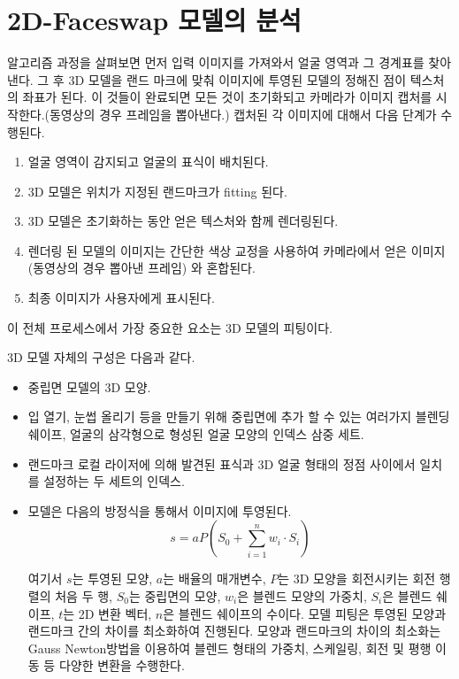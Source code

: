 \documentclass{oblivoir}
\begin{document}
\section{2D-Faceswap 모델의 분석}

알고리즘 과정을 살펴보면 먼저 입력 이미지를 가져와서 얼굴 영역과 그 경계표를 찾아낸다. 그 후 3D 모델을 랜드 마크에 맞춰 이미지에 투영된 모델의 정해진 점이 텍스처의 좌표가 된다. 이 것들이 완료되면 모든 것이 초기화되고 카메라가 이미지 캡처를 시작한다.(동영상의 경우 프레임을 뽑아낸다.) 캡처된 각 이미지에 대해서 다음 단계가 수행된다.

\begin{enumerate}
    \item 얼굴 영역이 감지되고 얼굴의 표식이 배치된다.
    \item 3D 모델은 위치가 지정된 랜드마크가 fitting 된다.
    \item 3D 모델은 초기화하는 동안 얻은 텍스처와 함께 렌더링된다.
    \item 렌더링 된 모델의 이미지는 간단한 색상 교정을 사용하여 카메라에서 얻은 이미지(동영상의 경우 뽑아낸 프레임) 와 혼합된다.
    \item 최종 이미지가 사용자에게 표시된다.
\end{enumerate}

이 전체 프로세스에서 가장 중요한 요소는 3D 모델의 피팅이다. 

3D 모델 자체의 구성은 다음과 같다.

\begin{itemize}
    \item 중립면 모델의 3D 모양.
    \item 입 열기, 눈썹 올리기 등을 만들기 위해 중립면에 추가 할 수 있는 여러가지 블렌딩 쉐이프, 얼굴의 삼각형으로 형성된 얼굴 모양의 인덱스 삼중 세트.
    \item 랜드마크 로컬 라이저에 의해 발견된 표식과 3D 얼굴 형태의 정점 사이에서 일치를 설정하는 두 세트의 인덱스.
    \item 모델은 다음의 방정식을 통해서 이미지에 투영된다.
    \[ s = aP \left( S_{0} + \sum_{i=1}^{n} w_{i}\cdot S_{i}  \right)   \]

    여기서 $s$는 투영된 모양, $a$는 배율의 매개변수, $P$는 3D 모양을 회전시키는 회전 행렬의 처음 두 행, $S_0$는 중립면의 모양, $w_i$은 블렌드 모양의 가중치, $S_i$은 블렌드 쉐이프, $t$는 2D 변환 벡터, $n$은 블렌드 쉐이프의 수이다.
    모델 피팅은 투영된 모양과 랜드마크 간의 차이를 최소화하여 진행된다. 모양과 랜드마크의 차이의 최소화는 Gauss Newton방법을 이용하여 블렌드 형태의 가중치, 스케일링, 회전 및 평행 이동 등 다양한 변환을 수행한다.\cite{reference9}
\end{itemize}
\end{document}
